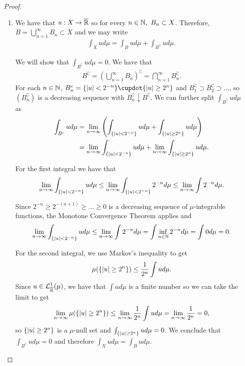 \begin{proof}$ $\newline
	\begin{enumerate}
		\item We have that $u: X \to {\overline{\mathbb{R}}}$ so for every $n \in \mathbb{N},\ B_n \subset X$. Therefore, $B = \bigcup_{n=1}^\infty B_n \subset X$ and we may write
		\begin{align*}
		\int_X u d\mu
		= \int_B u d\mu + \int_{B^\complement} u d\mu.
		\end{align*}
		
		We will show that $\int_{B^\complement} u d\mu = 0$. We have that
		\begin{align*}
		B^\complement = \left( \bigcup_{n=1}^\infty B_n \right)^\complement = \bigcap_{n=1}^\infty B_n^\complement.
		\end{align*}
		For each $n \in \mathbb{N}$, $B_n^\complement = \{\abs{u} < 2^{-n}\} \cupdot \{\abs{u} \geq 2^n\}$ and $B_1^\complement \supset B_2^\complement \supset \dots$, so $(B_n^\complement)$ is a decreasing sequence with $B_n^\complement \downarrow B^\complement$. We can further split $\int_{B^\complement} u d\mu$ as
		\begin{align*}
		\int_{B^c} ud\mu
		&= \lim_{n\to\infty} \left(\int_{\{\left\vert{u}\right\vert < 2^{-n}\}} ud\mu + \int_{\{\left\vert{u}\right\vert \geq 2^n\}} u d\mu\right) \\
		&= \lim_{n\to\infty} \int_{\{\left\vert{u}\right\vert < 2^{-n}\}} ud\mu + \lim_{n\to\infty} \int_{\{\left\vert{u}\right\vert \geq 2^n\}} u d\mu.
		\end{align*}
		
		For the first integral we have that
		\begin{align*}
		\lim_{n\to\infty} \int_{\{\left\vert{u}\right\vert < 2^{-n}\}} ud\mu
		\leq \lim_{n\to\infty} \int_{\{\left\vert{u}\right\vert < 2^{-n}\}} 2^{-n} d\mu
		\leq \lim_{n\to\infty} \int 2^{-n} d\mu.
		\end{align*}
		
		Since $2^{-n} \geq 2^{-(n+1)} \geq \dots \geq 0$ is a decreasing sequence of $\mu$-integrable functions, the Monotone Convergence Theorem applies and
		\begin{align*}
		\lim_{n\to\infty} \int_{\{\left\vert{u}\right\vert < 2^{-n}\}} ud\mu
		\leq \lim_{n\to\infty} \int 2^{-n} d\mu 
		= \int \inf_{n\in\mathbb{N}} 2^{-n} d\mu
		= \int 0 d\mu = 0.
		\end{align*}
		
		For the second integral, we use Markov's inequality to get
		\begin{align*}
		\mu(\{\left\vert{u}\right\vert \geq 2^n\}) \leq \frac{1}{2^n} \int u d\mu.
		\end{align*}
		Since $u \in \mathcal{L}^1_{\overline{\mathbb{R}}}(\mu)$, we have that $\int{u} d\mu$ is a finite number so we can take the limit to get
		\begin{align*}
		\lim_{n\to\infty} \mu(\{\left\vert{u}\right\vert \geq 2^n\}) \leq \lim_{n\to\infty} \frac{1}{2^n} \int u d\mu = \lim_{n\to\infty} \frac{1}{2^n} = 0,
		\end{align*}
		so $\{\left\vert{u}\right\vert \geq 2^n\}$ is a $\mu$-null set and $\int_{\{\left\vert{u}\right\vert \geq 2^n\}} u d\mu = 0$. We conclude that $\int_{B^\complement} u d\mu = 0$ and therefore $\int_X u d\mu = \int_B u d\mu$.
		

\end{enumerate}
\end{proof}
